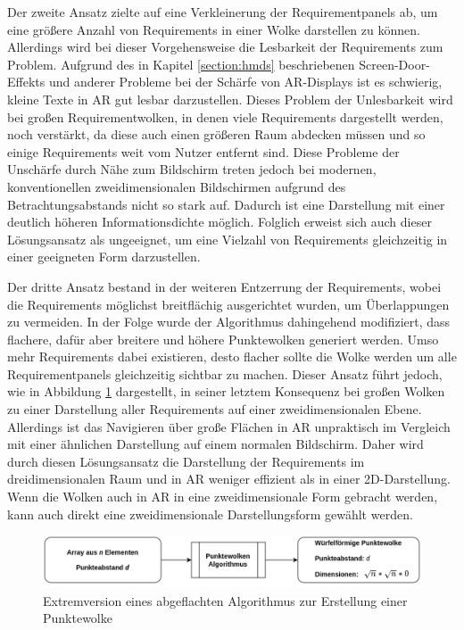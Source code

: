 Der zweite Ansatz zielte auf eine Verkleinerung der Requirementpanels ab, um eine größere Anzahl von Requirements in einer Wolke darstellen zu können.
Allerdings wird bei dieser Vorgehensweise die Lesbarkeit der Requirements zum Problem.
Aufgrund des in Kapitel \ref{section:hmds} beschriebenen Screen-Door-Effekts und anderer Probleme bei der Schärfe von AR-Displays ist es schwierig, kleine Texte in AR gut lesbar darzustellen.
Dieses Problem der Unlesbarkeit wird bei großen Requirementwolken, in denen viele Requirements dargestellt werden, noch verstärkt, da diese auch einen größeren Raum abdecken müssen und so einige Requirements weit vom Nutzer entfernt sind.
Diese Probleme der Unschärfe durch Nähe zum Bildschirm treten jedoch bei modernen, konventionellen zweidimensionalen Bildschirmen aufgrund des Betrachtungsabstands nicht so stark auf.
Dadurch ist eine Darstellung mit einer deutlich höheren Informationsdichte möglich.
Folglich erweist sich auch dieser Lösungsansatz als ungeeignet, um eine Vielzahl von Requirements gleichzeitig in einer geeigneten Form darzustellen.

Der dritte Ansatz bestand in der weiteren Entzerrung der Requirements, wobei die Requirements möglichst breitflächig ausgerichtet wurden, um Überlappungen zu vermeiden.
In der Folge wurde der Algorithmus dahingehend modifiziert, dass flachere, dafür aber breitere und höhere Punktewolken generiert werden.
Umso mehr Requirements dabei existieren, desto flacher sollte die Wolke werden um alle Requirementpanels gleichzeitig sichtbar zu machen.
Dieser Ansatz führt jedoch, wie in Abbildung \ref{fig:wolken-algo-ang2} dargestellt, in seiner letztem Konsequenz bei großen Wolken zu einer Darstellung aller Requirements auf einer zweidimensionalen Ebene.
Allerdings ist das Navigieren über große Flächen in AR unpraktisch im Vergleich mit einer ähnlichen Darstellung auf einem normalen Bildschirm.
Daher wird durch diesen Lösungsansatz die Darstellung der Requirements im dreidimensionalen Raum und in AR weniger effizient als in einer 2D-Darstellung.
Wenn die Wolken auch in AR in eine zweidimensionale Form gebracht werden, kann auch direkt eine zweidimensionale Darstellungsform gewählt werden.

\begin{figure}[H]
    \centering
    \includegraphics[width=1\textwidth]{images/WolkenAlgoAngepasst2.png}
    \caption{Extremversion eines abgeflachten Algorithmus zur Erstellung einer Punktewolke}
    \label{fig:wolken-algo-ang2}
\end{figure}

